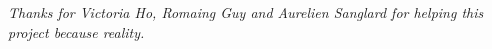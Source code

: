 \clearpage
\thispagestyle{empty}
\vspace*{\fill}
\begin{center}
\begin{minipage}{.6\textwidth}
\emph{Thanks for Victoria Ho, Romaing Guy and Aurelien Sanglard for helping this project because reality.\\}
\end{minipage}
\end{center}
\vfill %
\clearpage
